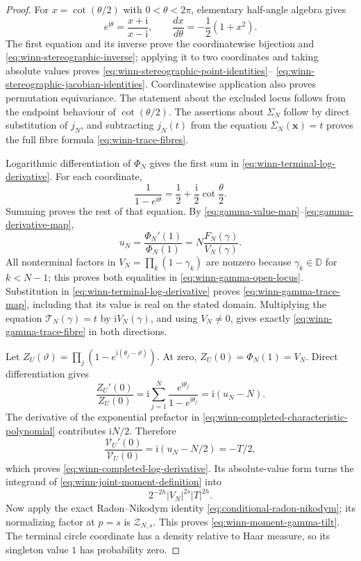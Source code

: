 \begin{proof}
For $x=\cot(\theta/2)$ with $0<\theta<2\pi$, elementary half-angle algebra gives
\[
 e^{\mathrm i\theta}=\frac{x+\mathrm i}{x-\mathrm i},
 \qquad
 \frac{dx}{d\theta}=-\frac12(1+x^2).
\]
The first equation and its inverse prove the coordinatewise bijection and
\eqref{eq:winn-stereographic-inverse}; applying it to two coordinates and taking
absolute values proves \eqref{eq:winn-stereographic-point-identities}--
\eqref{eq:winn-stereographic-jacobian-identities}.  Coordinatewise application also
proves permutation equivariance.  The statement about the excluded locus follows from
the endpoint behaviour of $\cot(\theta/2)$.  The assertions about $\Sigma_N$ follow by
direct substitution of $j_N$, and subtracting $j_N(t)$ from the equation
$\Sigma_N(\mathbf x)=t$ proves the full fibre formula
\eqref{eq:winn-trace-fibres}.

Logarithmic differentiation of $\Phi_N$ gives the first sum in
\eqref{eq:winn-terminal-log-derivative}.  For each coordinate,
\[
 \frac1{1-e^{\mathrm i\theta}}
 =\frac12+\frac{\mathrm i}{2}\cot\frac\theta2.
\]
Summing proves the rest of that equation.  By
\eqref{eq:gamma-value-map}--\eqref{eq:gamma-derivative-map},
\[
 u_N=\frac{\Phi_N'(1)}{\Phi_N(1)}
 =N\frac{F_N(\gamma)}{V_N(\gamma)}.
\]
All nonterminal factors in $V_N=\prod_k(1-\gamma_k)$ are nonzero because
$\gamma_k\in\mathbb D$ for $k<N-1$; this proves both equalities in
\eqref{eq:winn-gamma-open-locus}.  Substitution in
\eqref{eq:winn-terminal-log-derivative} proves
\eqref{eq:winn-gamma-trace-map}, including that its value is real on the stated
domain.  Multiplying the equation $\mathcal T_N(\gamma)=t$ by
$\mathrm iV_N(\gamma)$, and using $V_N\ne0$, gives exactly
\eqref{eq:winn-gamma-trace-fibre} in both directions.

Let
$Z_U(\vartheta)=\prod_j(1-e^{\mathrm i(\theta_j-\vartheta)})$.  At zero,
$Z_U(0)=\Phi_N(1)=V_N$.  Direct differentiation gives
\[
 \frac{Z_U'(0)}{Z_U(0)}
 =\mathrm i\sum_{j=1}^{N}
 \frac{e^{\mathrm i\theta_j}}{1-e^{\mathrm i\theta_j}}
 =\mathrm i(u_N-N).
\]
The derivative of the exponential prefactor in
\eqref{eq:winn-completed-characteristic-polynomial} contributes
$\mathrm iN/2$.  Therefore
\[
 \frac{\mathcal V_U'(0)}{\mathcal V_U(0)}
 =\mathrm i(u_N-N/2)=-T/2,
\]
which proves \eqref{eq:winn-completed-log-derivative}.  Its absolute-value form
turns the integrand of \eqref{eq:winn-joint-moment-definition} into
\[
 2^{-2h}|V_N|^{2s}|T|^{2h}.
\]
Now apply the exact Radon--Nikodym identity
\eqref{eq:conditional-radon-nikodym}; its normalizing factor at $p=s$ is
$\mathcal Z_{N,s}$.  This proves \eqref{eq:winn-moment-gamma-tilt}.  The terminal
circle coordinate has a density relative to Haar measure, so its singleton value $1$
has probability zero.


\end{proof}
